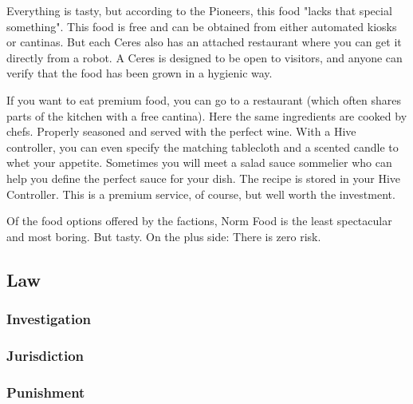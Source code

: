 Everything is tasty, but according to the Pioneers, this food "lacks that special something".
This food is free and can be obtained from either automated kiosks or cantinas. But each Ceres also has an attached restaurant where you can get it directly from a robot. A Ceres is designed to be open to visitors, and anyone can verify that the food has been grown in a hygienic way.

If you want to eat premium food, you can go to a restaurant (which often shares parts of the kitchen with a free cantina). Here the same ingredients are cooked by chefs. Properly seasoned and served with the perfect wine. With a Hive controller, you can even specify the matching tablecloth and a scented candle to whet your appetite.
Sometimes you will meet a salad sauce sommelier who can help you define the perfect sauce for your dish. The recipe is stored in your Hive Controller. This is a premium service, of course, but well worth the investment.

Of the food options offered by the factions, Norm Food is the least spectacular and most boring. But tasty. On the plus side: There is zero risk.

\subsection{Law}
\label{sec: norm law}

\subsubsection{Investigation}


\subsubsection{Jurisdiction}


\subsubsection{Punishment}





